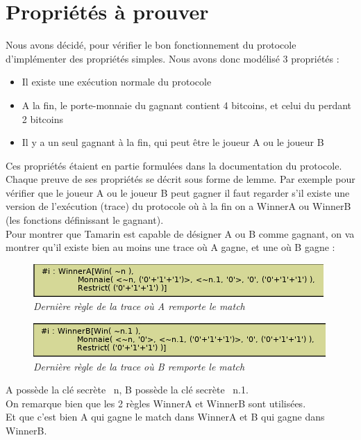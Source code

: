 \documentclass[conference]{IEEEtran}
\begin{document}
\section{Propriétés à prouver}
\label{sec:sec-5}
Nous avons décidé, pour vérifier le bon fonctionnement du protocole d'implémenter des propriétés simples. Nous avons donc modélisé 3 propriétés :
\begin{itemize}
    \item Il existe une exécution normale du protocole
    \item A la fin, le porte-monnaie du gagnant contient 4 bitcoins, et celui du perdant 2 bitcoins
    \item Il y a un seul gagnant à la fin, qui peut être le joueur A ou le joueur B \\
\end{itemize}
Ces propriétés étaient en partie formulées dans la documentation du protocole.
Chaque preuve de ses propriétés se décrit sous forme de lemme. Par exemple pour vérifier que le joueur A ou le joueur B peut gagner il faut regarder s'il existe une version de l'exécution (trace) du protocole où à la fin on a WinnerA ou WinnerB (les fonctions définissant le gagnant).\\

Pour montrer que Tamarin est capable de désigner A ou B comme gagnant, on va montrer qu'il existe bien au moins une trace où A gagne, et une où B gagne : 
\begin{figure}[!h]
    \centering
    \includegraphics[scale=0.62]{winnerA.png}
    \caption{\textit{Dernière règle de la trace où A remporte le match}}
    \label{fig:winnerA}
\end{figure}
\vspace{-0.3cm}
\begin{figure}[!h]
    \centering
    \includegraphics[scale=0.62]{winnerB.png}
    \caption{\textit{Dernière règle de la trace où B remporte le match}}
    \label{fig:winnerB}
\end{figure}


A possède la clé secrète ~n, B possède la clé secrète ~n.1. \\On remarque bien que les 2 règles WinnerA et WinnerB sont utilisées. \\Et que c'est bien A qui gagne le match dans WinnerA et B qui gagne dans WinnerB. 
\end{document}
